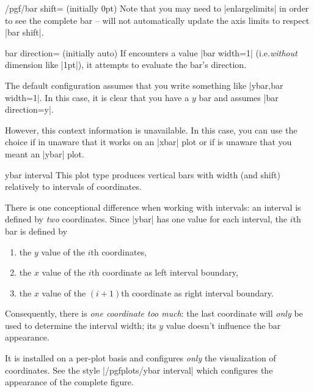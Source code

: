 {\begin{key}{/pgf/bar shift= (initially 0pt)}
    Note that you may need to |enlargelimits| in order to see the complete bar
    -- \PGFPlots{} will not automatically update the axis limits to respect
    |bar shift|.
\end{key}

\begin{pgfplotskey}{bar direction= (initially auto)}
    If \PGFPlots{} encounters a value |bar width=1| (i.e.\@ \emph{without}
    dimension like |1pt|), it attempts to evaluate the bar's direction.

    The default configuration  assumes that you write
    something like |ybar,bar width=1|. In this case, it is clear that you have
    a $y$ bar and \PGFPlots{} assumes |bar direction=y|.

    However, this context information is unavailable. In this case, you can use
    the choice  if \PGFPlots{} in unaware that it works on an
    |xbar| plot or  if \PGFPlots{} is unaware that you meant an
    |ybar| plot.
\end{pgfplotskey}

\begin{plottype}{ybar interval}
    This plot type produces vertical bars with width (and shift) relatively to
    intervals of coordinates.

    There is one conceptional difference when working with intervals: an
    interval is defined by \emph{two} coordinates. Since |ybar| has one value
    for each interval, the $i$th bar is defined by
    \begin{enumerate}
        \item the $y$ value of the $i$th coordinates,
        \item the $x$ value of the $i$th coordinate as left interval
            boundary,
        \item the $x$ value of the $(i+1)$th coordinate as right interval
            boundary.
    \end{enumerate}
    Consequently, there is \emph{one coordinate too much}: the last coordinate
    will \emph{only} be used to determine the interval width; its $y$ value
    doesn't influence the bar appearance.

    It is installed on a per-plot basis and configures \emph{only} the
    visualization of coordinates. See the style |/pgfplots/ybar interval| which
    configures the appearance of the complete figure.
\begin{codeexample}[]
\end{codeexample}


\end{plottype}}

